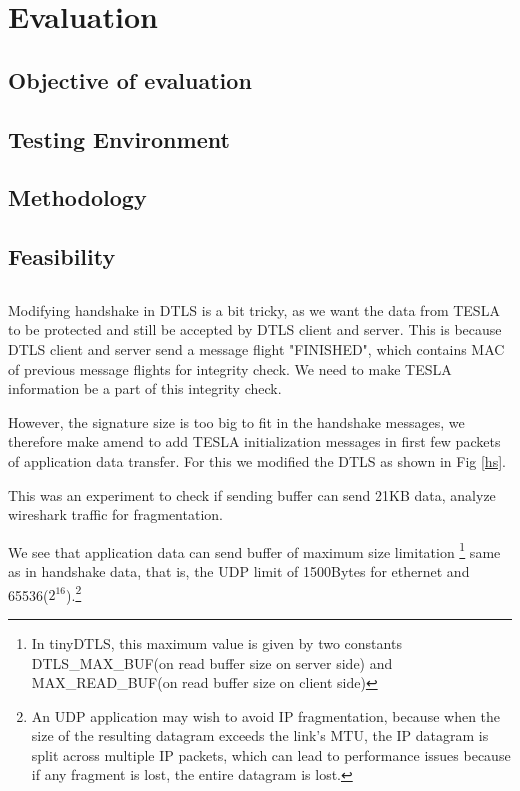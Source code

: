 \chapter{Evaluation}
\label{Evaluation}

\section{Objective of evaluation}

\section{Testing Environment}

\section{Methodology}

\section{Feasibility}

\section{}




Modifying handshake in DTLS is a bit tricky, as we want the data from TESLA to be protected and still be accepted by DTLS client and server. This is because DTLS client and server send a message flight "FINISHED", which contains MAC of previous message flights for integrity check. We need to make TESLA information be a part of this integrity check.

However, the signature size is too big to fit in the handshake messages, we therefore make amend to add TESLA initialization messages in first few packets of application data transfer. For this we modified the DTLS as shown in Fig \ref{hs}.


This was an experiment to check if sending buffer can send 21KB data, analyze wireshark traffic for fragmentation.

We see that application data can send buffer of maximum size limitation \footnote{In tinyDTLS, this maximum value is given by two constants DTLS\_MAX\_BUF(on read buffer size on server side) and MAX\_READ\_BUF(on read buffer size on client side)} same as in handshake data, that is, the UDP limit of 1500Bytes for ethernet and 65536($2^{16}$).\footnote{An UDP application may wish to avoid IP fragmentation, because when the size of the resulting datagram exceeds the link’s MTU, the IP datagram is split across multiple IP packets, which can lead to performance issues because if any fragment is lost, the entire datagram is lost.}

